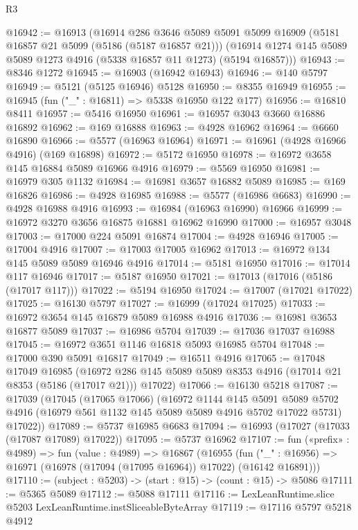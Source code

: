 \begin{lexlean}{R3}
\begin{coremodule}
@16942 := @16913
    (@16914
      @286
      @3646
      @5089
      @5091
      @5099
      @16909
      (@5181 @16857 @21 @5099 (@5186 (@5187 @16857 @21)))
      (@16914 @1274 @145 @5089 @5089 @1273 @4916 (@5338 @16857 @11 @1273) (@5194 @16857)))
@16943 := @8346 @1272
@16945 := @16903 (@16942 @16943)
@16946 := @140 @5797
@16949 := @5121 (@5125 @16946) @5128
@16950 := @8355 @16949
@16955 := @16945 (fun ("_" : @16811) => @5338 @16950 @122 @177)
@16956 := @16810 @8411
@16957 := @5416 @16950
@16961 := @16957 @3043 @3660 @16886 @16892
@16962 := @169 @16888
@16963 := @4928 @16962
@16964 := @6660 @16890
@16966 := @5577 (@16963 @16964)
@16971 := @16961 (@4928 @16966 @4916) (@169 @16898)
@16972 := @5172 @16950
@16978 := @16972 @3658 @145 @16884 @5089 @16966 @4916
@16979 := @5569 @16950
@16981 := @16979 @305 @1132
@16984 := @16981 @3657 @16882 @5089
@16985 := @169 @16826
@16986 := @4928 @16985
@16988 := @5577 (@16986 @6683)
@16990 := @4928 @16988 @4916
@16993 := @16984 (@16963 @16990) @16966
@16999 := @16972 @3270 @3656 @16875 @16881 @16962 @16990
@17000 := @16957 @3048
@17003 := @17000 @224 @5091 @16874
@17004 := @4928 @16946
@17005 := @17004 @4916
@17007 := @17003 @17005 @16962
@17013 := @16972 @134 @145 @5089 @5089 @16946 @4916
@17014 := @5181 @16950
@17016 := @17014 @117 @16946
@17017 := @5187 @16950
@17021 := @17013 (@17016 (@5186 (@17017 @117)))
@17022 := @5194 @16950
@17024 := @17007 (@17021 @17022)
@17025 := @16130 @5797
@17027 := @16999 (@17024 @17025)
@17033 := @16972 @3654 @145 @16879 @5089 @16988 @4916
@17036 := @16981 @3653 @16877 @5089
@17037 := @16986 @5704
@17039 := @17036 @17037 @16988
@17045 := @16972 @3651 @1146 @16818 @5093 @16985 @5704
@17048 := @17000 @390 @5091 @16817
@17049 := @16511 @4916
@17065 := @17048
    @17049
    @16985
    (@16972 @286 @145 @5089 @5089 @8353 @4916 (@17014 @21 @8353 (@5186 (@17017 @21))) @17022)
@17066 := @16130 @5218
@17087 := @17039
    (@17045
      (@17065 @17066)
      (@16972
        @1144
        @145
        @5091
        @5089
        @5702
        @4916
        (@16979 @561 @1132 @145 @5089 @5089 @4916 @5702 @17022 @5731)
        @17022))
@17089 := @5737 @16985 @6683
@17094 := @16993 (@17027 (@17033 (@17087 @17089) @17022))
@17095 := @5737 @16962
@17107 := fun («prefix» : @4989) =>
  fun (value : @4989) =>
  @16867
    (@16955 (fun ("_" : @16956) => @16971 (@16978 (@17094 (@17095 @16964)) @17022) (@16142 @16891)))
@17110 := (subject : @5203) -> (start : @15) -> (count : @15) -> @5086
@17111 := @5365 @5089
@17112 := @5088 @17111
@17116 := LexLeanRuntime.slice @5203 LexLeanRuntime.instSliceableByteArray
@17119 := @17116 @5797 @5218 @4912

\end{coremodule}
\end{lexlean}
